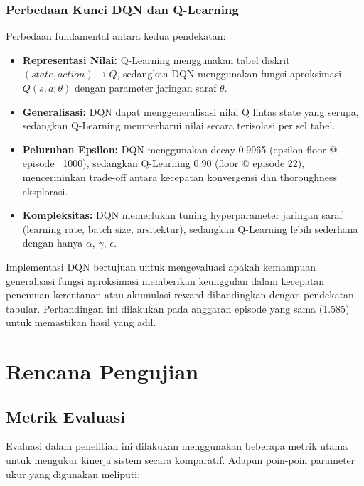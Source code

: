 \subsubsection{Perbedaan Kunci DQN dan Q-Learning}

Perbedaan fundamental antara kedua pendekatan:
\begin{itemize}
    \item \textbf{Representasi Nilai:} Q-Learning menggunakan tabel diskrit $(state, action) \rightarrow Q$, sedangkan DQN menggunakan fungsi aproksimasi $Q(s,a; \theta)$ dengan parameter jaringan saraf $\theta$.
    \item \textbf{Generalisasi:} DQN dapat menggeneralisasi nilai Q lintas state yang serupa, sedangkan Q-Learning memperbarui nilai secara terisolasi per sel tabel.
    \item \textbf{Peluruhan Epsilon:} DQN menggunakan decay 0.9965 (epsilon floor @ episode ~1000), sedangkan Q-Learning 0.90 (floor @ episode 22), mencerminkan trade-off antara kecepatan konvergensi dan thoroughness eksplorasi.
    \item \textbf{Kompleksitas:} DQN memerlukan tuning hyperparameter jaringan saraf (learning rate, batch size, arsitektur), sedangkan Q-Learning lebih sederhana dengan hanya $\alpha$, $\gamma$, $\epsilon$.
\end{itemize}

Implementasi DQN bertujuan untuk mengevaluasi apakah kemampuan generalisasi fungsi aproksimasi memberikan keunggulan dalam kecepatan penemuan kerentanan atau akumulasi reward dibandingkan dengan pendekatan tabular. Perbandingan ini dilakukan pada anggaran episode yang sama (1.585) untuk memastikan hasil yang adil.

\section{Rencana Pengujian}

\subsection{Metrik Evaluasi}

Evaluasi dalam penelitian ini dilakukan menggunakan beberapa metrik utama untuk mengukur kinerja sistem secara komparatif. Adapun poin-poin parameter ukur yang digunakan meliputi:

